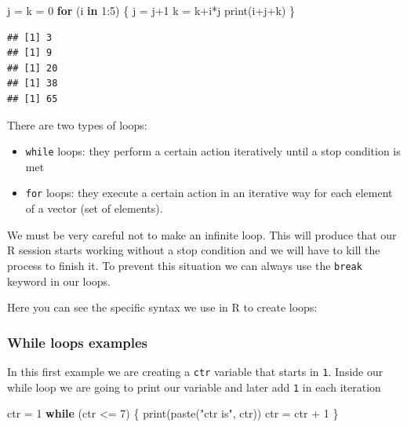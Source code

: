 \documentclass[
]{book}
\newenvironment{Shaded}{\begin{snugshade}}{\end{snugshade}}
\newcommand{\ControlFlowTok}[1]{\textcolor[rgb]{0.13,0.29,0.53}{\textbf{#1}}}
\newcommand{\DecValTok}[1]{\textcolor[rgb]{0.00,0.00,0.81}{#1}}
\newcommand{\FunctionTok}[1]{\textcolor[rgb]{0.00,0.00,0.00}{#1}}
\newcommand{\NormalTok}[1]{#1}
\newcommand{\OtherTok}[1]{\textcolor[rgb]{0.56,0.35,0.01}{#1}}
\newcommand{\SpecialCharTok}[1]{\textcolor[rgb]{0.00,0.00,0.00}{#1}}
\newcommand{\StringTok}[1]{\textcolor[rgb]{0.31,0.60,0.02}{#1}}
\theoremstyle{definition}
\theoremstyle{definition}
\theoremstyle{definition}
\theoremstyle{definition}
\theoremstyle{remark}
\begin{document}
\begin{Shaded}
\begin{Highlighting}[]
\NormalTok{j }\OtherTok{=}\NormalTok{ k }\OtherTok{=} \DecValTok{0}
\ControlFlowTok{for}\NormalTok{ (i }\ControlFlowTok{in} \DecValTok{1}\SpecialCharTok{:}\DecValTok{5}\NormalTok{) \{}
\NormalTok{  j }\OtherTok{=}\NormalTok{ j}\SpecialCharTok{+}\DecValTok{1}
\NormalTok{  k }\OtherTok{=}\NormalTok{ k}\SpecialCharTok{+}\NormalTok{i}\SpecialCharTok{*}\NormalTok{j}
  \FunctionTok{print}\NormalTok{(i}\SpecialCharTok{+}\NormalTok{j}\SpecialCharTok{+}\NormalTok{k)}
\NormalTok{  \}}
\end{Highlighting}
\end{Shaded}

\begin{verbatim}
## [1] 3
## [1] 9
## [1] 20
## [1] 38
## [1] 65
\end{verbatim}

There are two types of loops:

\begin{itemize}
\item
  \texttt{while} loops: they perform a certain action iteratively until a stop condition is met
\item
  \texttt{for} loops: they execute a certain action in an iterative way for each element of a vector (set of elements).
\end{itemize}

We must be very careful not to make an infinite loop. This will produce that our R session starts working without a stop condition and we will have to kill the process to finish it. To prevent this situation we can always use the \texttt{break} keyword in our loops.

Here you can see the specific syntax we use in R to create loops:

\hypertarget{while-loops-examples}{%
\subsubsection{While loops examples}\label{while-loops-examples}}

In this first example we are creating a \texttt{ctr} variable that starts in \texttt{1}. Inside our while loop we are going to print our variable and later add \texttt{1} in each iteration

\begin{Shaded}
\begin{Highlighting}[]
\NormalTok{ctr }\OtherTok{=} \DecValTok{1}
\ControlFlowTok{while}\NormalTok{ (ctr }\SpecialCharTok{\textless{}=} \DecValTok{7}\NormalTok{) \{}
  \FunctionTok{print}\NormalTok{(}\FunctionTok{paste}\NormalTok{(}\StringTok{"ctr is"}\NormalTok{, ctr))}
\NormalTok{  ctr }\OtherTok{=}\NormalTok{ ctr }\SpecialCharTok{+} \DecValTok{1}
\NormalTok{\}}
\end{Highlighting}
\end{Shaded}
\end{document}
